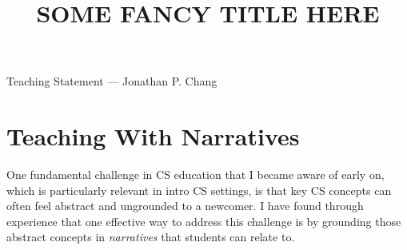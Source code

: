 \documentclass[12pt,letterpaper]{article}
\title{SOME FANCY TITLE HERE}
\begin{document}
\maketitle

{\centering Teaching Statement --- Jonathan P. Chang \par}

\vspace{0.5\baselineskip}
\ifliberalarts
\lateachingintro
\else
\genteachingintro
\fi
%


\section{Teaching With Narratives}
One fundamental challenge in CS education that I became aware of early on, which is particularly relevant in intro CS settings, is that key CS concepts can often feel abstract and ungrounded to a newcomer.
I have found through experience that one effective way to address this challenge is by grounding those abstract concepts in \emph{narratives} that students can relate to.
\end{document}
